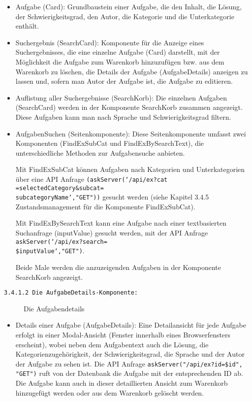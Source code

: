 \begin{itemize}

\item Aufgabe (Card):
Grundbaustein einer Aufgabe, die den Inhalt, die Lösung, der Schwierigkeitsgrad, den Autor, die Kategorie und die Unterkategorie enthält.

\item Suchergebnis (SearchCard):
Komponente für die Anzeige eines Suchergebnisses, die eine einzelne Aufgabe (Card) darstellt, mit der Möglichkeit die Aufgabe zum Warenkorb hinzuzufügen bzw. aus dem Warenkorb zu löschen, die Details der Aufgabe (AufgabeDetails) anzeigen zu lassen und, sofern man Autor der Aufgabe ist, die Aufgabe zu editieren.

\item Auflistung aller Suchergebnisse (SearchKorb):
Die einzelnen Aufgaben (SearchCard) werden in der Komponente SearchKorb zusammen angezeigt.
Diese Aufgaben kann man nach Sprache und Schwierigkeitsgrad filtern.

\item AufgabenSuchen (Seitenkomponente):
Diese Seitenkomponente umfasst zwei Komponenten (FindExSubCat und FindExBySearchText), die unterschiedliche Methoden zur Aufgabensuche anbieten. 

Mit FindExSubCat können Aufgaben nach Kategorien und Unterkategorien über eine API Anfrage \texttt{(askServer(`/api/ex?cat ={selectedCategory}\&subcat=\\{subcategoryName}`,"GET"))} gesucht werden (siehe Kapitel 3.4.5 Zustandsmanagement für die Komponente FindExSubCat).

Mit FindExBySearchText kann eine Aufgabe nach einer textbasierten Suchanfrage (inputValue) gesucht werden, mit der API Anfrage \texttt{askServer(`/api/ex?search=\\\${inputValue}`,"GET")}.

Beide Male werden die anzuzeigenden Aufgaben in der Komponente SearchKorb angezeigt.


\end{itemize}

\texttt{3.4.1.2 Die AufgabeDetails-Komponente:}

\begin{figure}[H]
  \caption{Die Aufgabendetails \cite{fig:aufgabendetails}}
\end{figure}

\begin{itemize}
\item Details einer Aufgabe (AufgabeDetails):
Eine Detailansicht für jede Aufgabe erfolgt in einer Modal-Ansicht (Fenster innerhalb eines Browserfensters erscheint), wobei neben dem Aufgabentext auch die Lösung, die Kategorienzugehörigkeit, der Schwierigkeitsgrad, die Sprache und der Autor der Aufgabe zu sehen ist. 
Die API Anfrage \texttt{askServer("/api/ex?id=\${id}", "GET")} ruft von der Datenbank die Aufgabe mit der entsprechenden ID ab.
Die Aufgabe kann auch in dieser detaillierten Ansicht zum Warenkorb hinzugefügt werden oder aus dem Warenkorb gelöscht werden.



\end{itemize}

